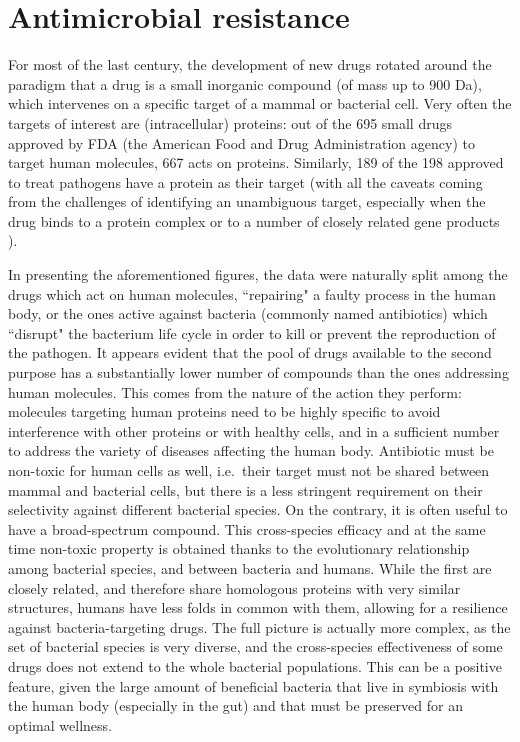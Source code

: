 \section{Antimicrobial resistance}

For most of the last century, the development of new drugs rotated around the paradigm that a drug is a small inorganic compound (of mass up to 900 Da), which intervenes on a specific target of a mammal or bacterial cell. Very often the targets of interest are (intracellular) proteins: out of the 695 small drugs approved by FDA (the American Food and Drug Administration agency) to target human molecules, 667 acts on proteins. Similarly, 189 of the 198 approved to treat pathogens have a protein as their target
%
(with all the caveats coming from the challenges of identifying an unambiguous target, especially when the drug binds to a protein complex or to a number of closely related gene products \citep{Santos2017}).

In presenting the aforementioned figures, the data were naturally split among the drugs which act on human molecules, ``repairing" a faulty process in the human body, or the ones active against bacteria (commonly named antibiotics) which ``disrupt" the bacterium life cycle in order to kill or prevent the reproduction of the pathogen.
%
It appears evident that the pool of drugs available to the second purpose has a substantially lower number of compounds than the ones addressing human molecules. This comes from the nature of the action they perform: molecules targeting human proteins need to be highly specific to avoid interference with other proteins or with healthy cells, and in a sufficient number to address the variety of diseases affecting the human body.
%
Antibiotic must be non-toxic for human cells as well, i.e.\ their target must not be shared between mammal and bacterial cells, but there is a less stringent requirement on their selectivity against different bacterial species. On the contrary, it is often useful to have a broad-spectrum compound. This cross-species efficacy and at the same time non-toxic property is obtained thanks to the evolutionary relationship among bacterial species, and between bacteria and humans. While the first are closely related, and therefore share homologous proteins with very similar structures, humans have less folds in common with them, allowing for a resilience against bacteria-targeting drugs.
%
The full picture is actually more complex, as the set of bacterial species is very diverse, and the cross-species effectiveness of some drugs does not extend to the whole bacterial populations. This can be a positive feature, given the large amount of beneficial bacteria that live in symbiosis with the human body (especially in the gut) and that must be preserved for an optimal wellness.

